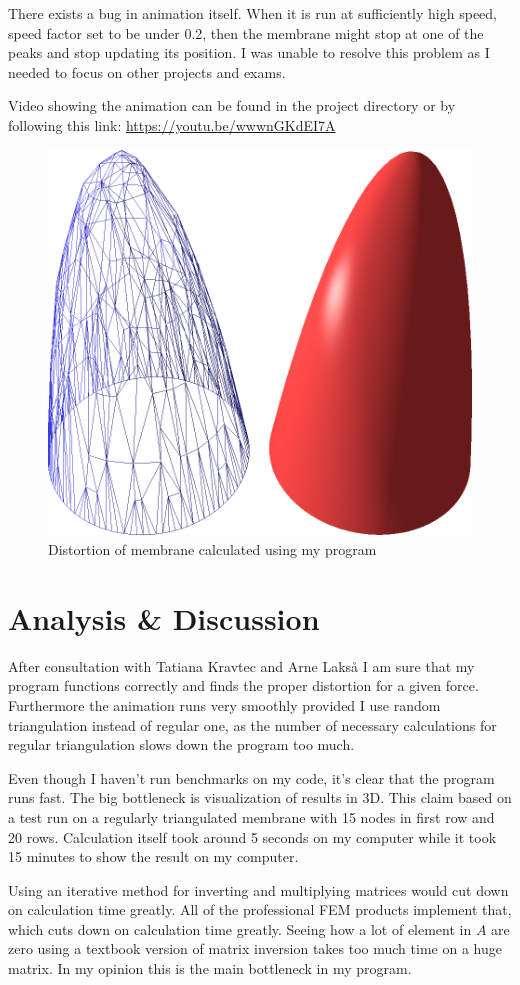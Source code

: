 \documentclass[a4,10pt]{article}
\begin{document}
There exists a bug in animation itself. When it is run at sufficiently high speed, speed factor set to be under 0.2, then the membrane might stop at one of the peaks and stop updating its position. I was unable to resolve this problem as I needed to focus on other projects and exams.

Video showing the animation can be found in the project directory or by following this link: \url{https://youtu.be/wwwnGKdEI7A} 

\begin{figure}[H]
  \centering
  \includegraphics[width=.65\textwidth]{Distortion}
  \caption{Distortion of membrane calculated using my program}\label{Distortion}
\end{figure}

\section{Analysis \& Discussion}
After consultation with Tatiana Kravtec and Arne Laks\aa{} I am sure that my program functions correctly and finds the proper distortion for a given force. Furthermore the animation runs very smoothly provided I use random triangulation instead of regular one, as the number of necessary calculations for regular triangulation slows down the program too much. 

Even though I haven't run benchmarks on my code, it's clear that the program runs fast. The big bottleneck is visualization of results in 3D. This claim based on a test run on a regularly triangulated membrane with 15 nodes in first row and 20 rows. Calculation itself took around 5 seconds on my computer while it took 15 minutes to show the result on my computer. 

Using an iterative method for inverting and multiplying matrices would cut down on calculation time greatly. All of the professional FEM products implement that, which cuts down on calculation time greatly. Seeing how a lot of element in $A$ are zero using a textbook version of matrix inversion takes too much time on a huge matrix. In my opinion this is the main bottleneck in my program. 
\end{document}
